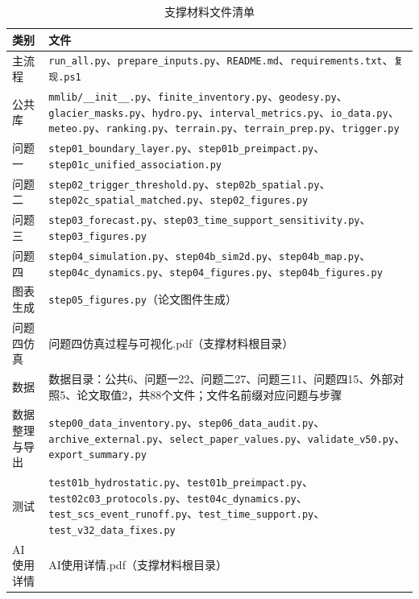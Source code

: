 \begin{table}[htbp]\centering\footnotesize
\caption{支撑材料文件清单}\label{tab:files}
\begin{tabularx}{\textwidth}{@{}>{\hsize}Y >{\hsize\centering\arraybackslash}X@{}}
\toprule
类别&文件\\
\midrule
主流程&\texttt{run\_all.py}、\texttt{prepare\_inputs.py}、\texttt{README.md}、\texttt{requirements.txt}、\texttt{复现.ps1}\\
公共库&\texttt{mmlib/\_\_init\_\_.py}、\texttt{finite\_inventory.py}、\texttt{geodesy.py}、\texttt{glacier\_masks.py}、\texttt{hydro.py}、\texttt{interval\_metrics.py}、\texttt{io\_data.py}、\texttt{meteo.py}、\texttt{ranking.py}、\texttt{terrain.py}、\texttt{terrain\_prep.py}、\texttt{trigger.py}\\
问题一&\texttt{step01\_boundary\_layer.py}、\texttt{step01b\_preimpact.py}、\texttt{step01c\_unified\_association.py}\\
问题二&\texttt{step02\_trigger\_threshold.py}、\texttt{step02b\_spatial.py}、\texttt{step02c\_spatial\_matched.py}、\texttt{step02\_figures.py}\\
问题三&\texttt{step03\_forecast.py}、\texttt{step03\_time\_support\_sensitivity.py}、\texttt{step03\_figures.py}\\
问题四&\texttt{step04\_simulation.py}、\texttt{step04b\_sim2d.py}、\texttt{step04b\_map.py}、\texttt{step04c\_dynamics.py}、\texttt{step04\_figures.py}、\texttt{step04b\_figures.py}\\
图表生成&\texttt{step05\_figures.py}（论文图件生成）\\
问题四仿真&问题四仿真过程与可视化.pdf（支撑材料根目录）\\
数据&数据目录：公共6、问题一22、问题二27、问题三11、问题四15、外部对照5、论文取值2，共88个文件；文件名前缀对应问题与步骤\\
数据整理与导出&\texttt{step00\_data\_inventory.py}、\texttt{step06\_data\_audit.py}、\texttt{archive\_external.py}、\texttt{select\_paper\_values.py}、\texttt{validate\_v50.py}、\texttt{export\_summary.py}\\
测试&\texttt{test01b\_hydrostatic.py}、\texttt{test01b\_preimpact.py}、\texttt{test02c03\_protocols.py}、\texttt{test04c\_dynamics.py}、\texttt{test\_scs\_event\_runoff.py}、\texttt{test\_time\_support.py}、\texttt{test\_v32\_data\_fixes.py}\\
AI 使用详情&AI使用详情.pdf（支撑材料根目录）\\
\bottomrule
\end{tabularx}\end{table}
